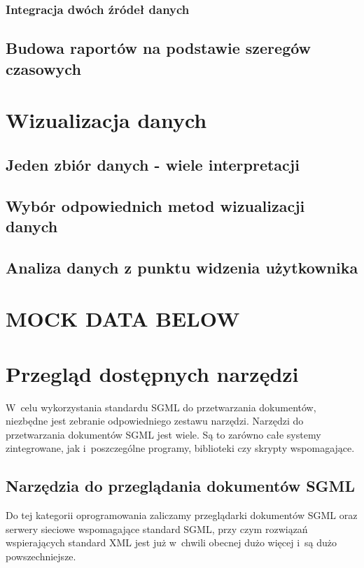 \documentclass[brudnopis]{xmgr}
\begin{document}
        \subsection{Integracja dwóch źródeł danych}

     \section{Budowa raportów na podstawie szeregów czasowych}

\chapter{Wizualizacja danych}

     \section{Jeden zbiór danych - wiele interpretacji}

     \section{Wybór odpowiednich metod wizualizacji danych}

     \section{Analiza danych z punktu widzenia użytkownika}

\chapter{MOCK DATA BELOW}

\chapter{Przegląd dostępnych narzędzi\label{PRZEGLAD.NARZEDZI}}

W~celu wykorzystania standardu SGML do przetwarzania dokumentów,
niezbędne jest zebranie odpowiedniego zestawu narzędzi. Narzędzi do
przetwarzania dokumentów SGML jest wiele. Są to zarówno całe
systemy zintegrowane, jak i~poszczególne programy, biblioteki czy
skrypty wspomagające.

\section{Narzędzia do przeglądania dokumentów SGML}

Do tej kategorii oprogramowania zaliczamy przeglądarki dokumentów
SGML oraz serwery sieciowe wspomagające standard SGML, przy
czym rozwiązań wspierających standard XML jest już w~chwili obecnej
dużo więcej i~są dużo powszechniejsze.
\end{document}
